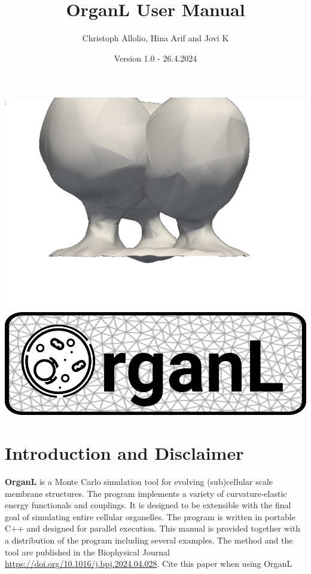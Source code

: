 \documentclass[11pt]{article}
\title{OrganL User Manual}
\author{Christoph Allolio, Hina Arif and Jovi K}
\date{Version 1.0 - 26.4.2024}
\begin{document}
\maketitle
\begin{center}
\includegraphics[width=0.5\linewidth]{buddings.png} \\
\includegraphics[width=0.5\linewidth]{logo.png}

\end{center}
\newpage
{}
\section{Introduction and Disclaimer}


\textbf{OrganL} is a Monte Carlo simulation tool for evolving (sub)cellular scale membrane structures. The program implements a variety of curvature-elastic energy functionals and couplings. It is designed to be extensible with the final goal of simulating entire cellular organelles. The program is written in portable C++ and designed for parallel execution. This manual is provided together with a distribution of the program including several examples. The method and the tool are published in the Biophysical Journal \url{https://doi.org/10.1016/j.bpj.2024.04.028}. Cite this paper when using OrganL\\
\vspace{0.5 cm}
\end{document}
